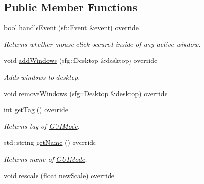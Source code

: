 \subsection*{Public Member Functions}
\begin{DoxyCompactItemize}
\item 
\hypertarget{classGUIModeManagement_a7af5f6b7024c11a06379a241d70f6bfc}{bool \hyperlink{classGUIModeManagement_a7af5f6b7024c11a06379a241d70f6bfc}{handle\-Event} (sf\-::\-Event \&event) override}\label{classGUIModeManagement_a7af5f6b7024c11a06379a241d70f6bfc}

\begin{DoxyCompactList}\small\item\em Returns whether mouse click occured inside of any active window. \end{DoxyCompactList}\item 
\hypertarget{classGUIModeManagement_a4b85e7c62287b1e2f7b9ebf53cefc72e}{void \hyperlink{classGUIModeManagement_a4b85e7c62287b1e2f7b9ebf53cefc72e}{add\-Windows} (sfg\-::\-Desktop \&desktop) override}\label{classGUIModeManagement_a4b85e7c62287b1e2f7b9ebf53cefc72e}

\begin{DoxyCompactList}\small\item\em Adds windows to desktop. \end{DoxyCompactList}\item 
void \hyperlink{classGUIModeManagement_a1c1602738b2628a7f31d7ccd0201a99a}{remove\-Windows} (sfg\-::\-Desktop \&desktop) override
\item 
\hypertarget{classGUIModeManagement_a6eb3d7e84c3a3b522b4546b3e340f5b8}{int \hyperlink{classGUIModeManagement_a6eb3d7e84c3a3b522b4546b3e340f5b8}{get\-Tag} () override}\label{classGUIModeManagement_a6eb3d7e84c3a3b522b4546b3e340f5b8}

\begin{DoxyCompactList}\small\item\em Returns tag of \hyperlink{classGUIMode}{G\-U\-I\-Mode}. \end{DoxyCompactList}\item 
\hypertarget{classGUIModeManagement_ae00eac44914029a5a57c44818c5ee7ec}{std\-::string \hyperlink{classGUIModeManagement_ae00eac44914029a5a57c44818c5ee7ec}{get\-Name} () override}\label{classGUIModeManagement_ae00eac44914029a5a57c44818c5ee7ec}

\begin{DoxyCompactList}\small\item\em Returns name of \hyperlink{classGUIMode}{G\-U\-I\-Mode}. \end{DoxyCompactList}\item 
\hypertarget{classGUIModeManagement_afa378bf0f0c0c6e2e426b1e32a4f77e5}{void \hyperlink{classGUIModeManagement_afa378bf0f0c0c6e2e426b1e32a4f77e5}{rescale} (float new\-Scale) override}\label{classGUIModeManagement_afa378bf0f0c0c6e2e426b1e32a4f77e5}


\end{DoxyCompactItemize}
